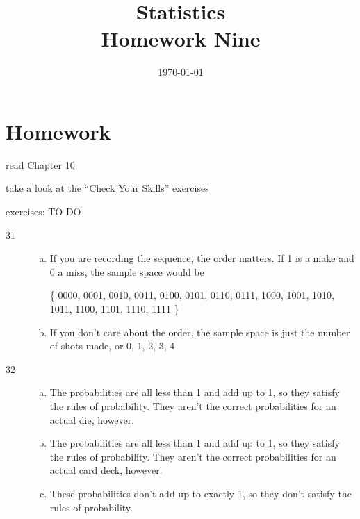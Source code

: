 \documentclass[letterpaper, landscape]{exam}
\title{Statistics \\ Homework Nine}
\date{\today}
\author{}
\begin{document}
  \maketitle

  \section{Homework}
    \begin{itemize*}
      \item read Chapter 10 
      \item take a look at the ``Check Your Skills'' exercises
      \item exercises: TO DO
    \end{itemize*}

  \ifprintanswers
    \begin{description}

      \item[31] 
        \begin{enumerate}[(a)]
          \item If you are recording the sequence, the order matters.  If 1 is a
            make and 0 a miss, the sample space would be 
            
            \{ 0000, 0001, 0010, 0011, 0100, 0101, 0110, 0111, 1000, 1001, 1010,
               1011, 1100, 1101, 1110, 1111 \}

          \item If you don't care about the order, the sample space is just the
            number of shots made, or {0, 1, 2, 3, 4 }

        \end{enumerate}

      \item[32]
        \begin{enumerate}[(a)]
          \item The probabilities are all less than 1 and add up to 1, so they
            satisfy the rules of probability.  They aren't the correct
            probabilities for an actual die, however.

          \item The probabilities are all less than 1 and add up to 1, so they
            satisfy the rules of probability.  They aren't the correct
            probabilities for an actual card deck, however.

          \item These probabilities don't add up to exactly 1, so they don't
            satisfy the rules of probability.  
        \end{enumerate}


\end{description}
\end{document}
